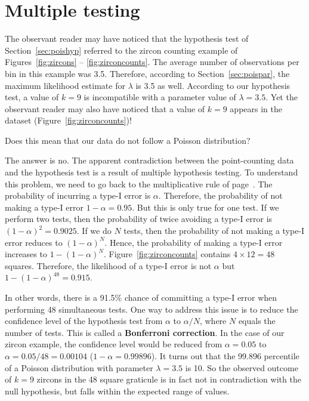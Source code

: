 \section{Multiple testing}
\label{sec:multipletesting}

The observant reader may have noticed that the hypothesis test of
Section~\ref{sec:poishyp} referred to the zircon counting example of
Figures~\ref{fig:zircons} -- \ref{fig:zirconcounts}. The average
number of observations per bin in this example was 3.5. Therefore,
according to Section~\ref{sec:poispar}, the maximum likelihood
estimate for $\lambda$ is 3.5 as well. According to our hypothesis
test, a value of $k=9$ is incompatible with a parameter value of
$\lambda=3.5$. Yet the observant reader may also have noticed that a
value of $k=9$ appears in the dataset
(Figure~\ref{fig:zirconcounts})!\medskip

Does this mean that our data do not follow a Poisson distribution?\medskip

The answer is no. The apparent contradiction between the
point-counting data and the hypothesis test is a result of multiple
hypothesis testing. To understand this problem, we need to go back to
the multiplicative rule of page~\pageref{page:multiplication}.  The
probability of incurring a type-I error is $\alpha$. Therefore, the
probability of not making a type-I error $1-\alpha=0.95$.  But this is
only true for one test. If we perform two tests, then the probability
of twice avoiding a type-I error is $(1-\alpha)^2=0.9025$. If we do
$N$ tests, then the probability of not making a type-I error reduces
to $(1-\alpha)^N$. Hence, the probability of making a type-I error
increases to $1-(1-\alpha)^N$. Figure~\ref{fig:zirconcounts} contains
${4}\times{12}=48$ squares. Therefore, the likelihood of a type-I
error is not $\alpha$ but $1-(1-\alpha)^{48}=0.915$.\medskip

In other words, there is a 91.5\% chance of committing a type-I error
when performing 48 simultaneous tests. One way to address this issue
is to reduce the confidence level of the hypothesis test from $\alpha$
to $\alpha/N$, where $N$ equals the number of tests.  This is called a
\textbf{Bonferroni correction}. In the case of our zircon example, the
confidence level would be reduced from $\alpha=0.05$ to
$\alpha=0.05/48=0.00104$ ($1-\alpha=0.99896$).  It turns out that the
99.896 percentile of a Poisson distribution with parameter
$\lambda=3.5$ is 10. So the observed outcome of $k=9$ zircons in the
48 square graticule is in fact not in contradiction with the null
hypothesis, but falls within the expected range of values.\medskip

